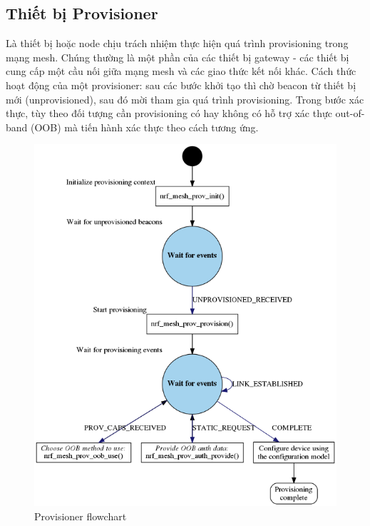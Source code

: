         \subsection{Thiết bị Provisioner}
        Là thiết bị hoặc node chịu trách nhiệm thực hiện quá trình provisioning trong mạng mesh. Chúng thường là một phần của các thiết bị gateway - các thiết bị cung cấp một cầu nối giữa mạng mesh và các giao thức kết nối khác.  Cách thức hoạt động của một provisioner: sau các bước khởi tạo thì chờ beacon từ thiết bị mới (unprovisioned), sau đó mời tham gia quá trình provisioning. Trong bước xác thực, tùy theo đối tượng cần provisioning có hay không có hỗ trợ xác thực out-of-band (OOB) mà tiến hành xác thực theo cách tương ứng.
        \begin{figure}[h!]
        	\begin{center}
        		\includegraphics[scale=0.6]{images/provisioner_app_flowchart.png}
        		\caption{Provisioner flowchart}
        	\end{center}
        \end{figure}
